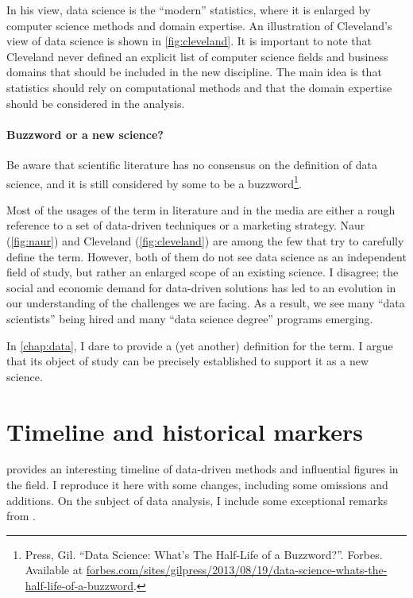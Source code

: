 In his view, data science is the ``modern'' statistics, where it is enlarged by computer
science methods and domain expertise.  An illustration of Cleveland's view of data science
is shown in \cref{fig:cleveland}.  It is important to note that Cleveland never defined an
explicit list of computer science fields and business domains that should be included in
the new discipline.  The main idea is that statistics should rely on computational methods
and that the domain expertise should be considered in the analysis.

\paragraph{Buzzword or a new science?}

Be aware that scientific literature has no consensus on the definition of data science, and it is still considered
by some to be a buzzword\footnote{Press, Gil. ``Data Science: What's The Half-Life of a
Buzzword?''. Forbes. Available at
\href{https://www.forbes.com/sites/gilpress/2013/08/19/data-science-whats-the-half-life-of-a-buzzword/}%
  {forbes.com/sites/gilpress/2013/08/19/data-science-whats-the-half-life-of-a-buzzword}.}.

Most of the usages of the term in literature and in the media are either a rough
reference to a set of data-driven techniques or a marketing strategy.  Naur
(\cref{fig:naur}) and Cleveland (\cref{fig:cleveland}) are among the few that try to
carefully define the term.  However, both of them do not see data science as an
independent field of study, but rather an enlarged scope of an existing science.  I disagree;
the social and economic demand for data-driven solutions has led to an evolution in our
understanding of the challenges we are facing.  As a result, we see many ``data
scientists'' being hired and many ``data science degree'' programs emerging.

In \cref{chap:data}, I dare to provide a (yet another) definition for the term.  I
argue that its object of study can be precisely established to support it as a new
science.

\section{Timeline and historical markers}

\textcite{Kelleher2018} provides an interesting timeline of data-driven methods and
influential figures in the field.  I reproduce it here with some changes, including
some omissions and additions.  On the subject of data analysis, I include some
exceptional remarks
from \textcite{Vapnik1999b}.


